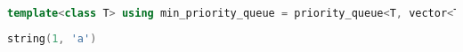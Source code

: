 \begin{lstlisting}[language=C++]
template<class T> using min_priority_queue = priority_queue<T, vector<T>, greater<T>>;
\end{lstlisting}

\begin{lstlisting}[language=C++]
string(1, 'a')
\end{lstlisting}